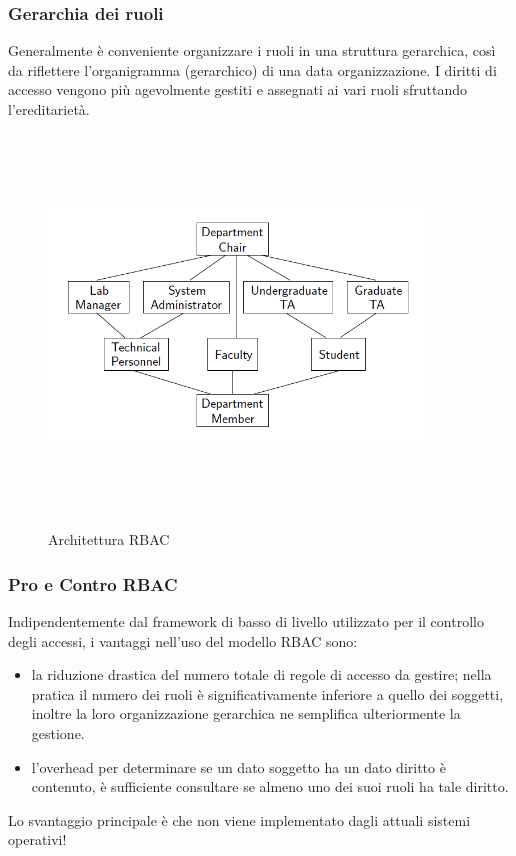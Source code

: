 \subsubsection{Gerarchia dei ruoli}
Generalmente è conveniente organizzare i ruoli in una struttura gerarchica, così da riflettere l’organigramma (gerarchico) di una data organizzazione. I diritti di accesso vengono più agevolmente gestiti e assegnati ai vari ruoli sfruttando l’ereditarietà.
\begin{figure}[htbp]
	\centering%
	\subfigure%
	{\includegraphics[height=10cm, width=10cm, keepaspectratio]{Immagini/Capitolo1/RBAC_ger.png}}
	\caption{Architettura RBAC \label{fig:RBAC_ger}} 	
\end{figure}

\subsubsection{Pro e Contro RBAC}
Indipendentemente dal framework di basso di livello utilizzato per il controllo degli accessi, i vantaggi nell’uso del modello RBAC sono:
\begin{itemize} 
  \item la riduzione drastica del numero totale di regole di accesso da gestire; nella pratica il numero dei ruoli è significativamente inferiore a quello dei soggetti, inoltre la loro organizzazione gerarchica ne semplifica ulteriormente la gestione.
  \item l'overhead per determinare se un dato soggetto ha un dato diritto è contenuto, è sufficiente consultare se almeno uno dei suoi ruoli ha tale diritto.
\end{itemize}
Lo svantaggio principale è che non viene implementato dagli attuali sistemi operativi!
